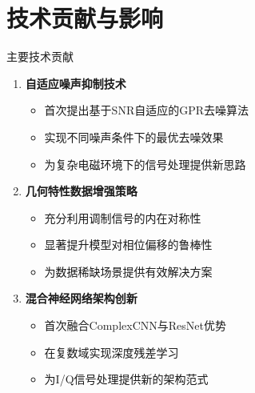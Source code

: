 \documentclass[aspectratio=169]{beamer}
\begin{document}
\section{技术贡献与影响}

\begin{frame}{主要技术贡献}
\begin{enumerate}
\item \textbf{自适应噪声抑制技术}
\begin{itemize}
\item 首次提出基于SNR自适应的GPR去噪算法
\item 实现不同噪声条件下的最优去噪效果
\item 为复杂电磁环境下的信号处理提供新思路
\end{itemize}

\item \textbf{几何特性数据增强策略}
\begin{itemize}
\item 充分利用调制信号的内在对称性
\item 显著提升模型对相位偏移的鲁棒性
\item 为数据稀缺场景提供有效解决方案
\end{itemize}

\item \textbf{混合神经网络架构创新}
\begin{itemize}
\item 首次融合ComplexCNN与ResNet优势
\item 在复数域实现深度残差学习
\item 为I/Q信号处理提供新的架构范式
\end{itemize}
\end{enumerate}
\end{frame}
\end{document}
